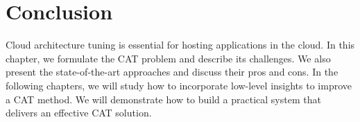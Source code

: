 \section{Conclusion}

Cloud architecture tuning is essential for hosting applications in the cloud.
In this chapter, we formulate the CAT problem and
describe its challenges.
We also present the state-of-the-art approaches and discuss
their pros and cons.
In the following chapters,
we will study how to incorporate low-level insights to improve a CAT method.
We will demonstrate how to build a practical system that delivers an effective
CAT solution.
